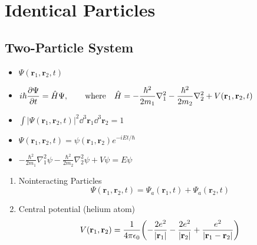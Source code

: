 \chapter{Identical Particles}

\section{Two-Particle System}
\begin{itemize}
	\item \(\Psi(\mathbf{r}_1,\mathbf{r}_2,t)\)
	\item \(\displaystyle{ i\hbar\pdv{\Psi}{t}=\hat{H}\Psi,\qquad\text{where} \quad \hat{H}=-\frac{\hbar^2}{2m_1}\nabla_1^2-\frac{\hbar^2}{2m_2}\nabla_2^2+V(\mathbf{r}_1,\mathbf{r}_2,t) }\)
	\item \(\displaystyle{  \int |\Psi(\mathbf{r}_1,\mathbf{r}_2,t)|^2 
		\dd^3\mathbf{r}_1 \dd^3\mathbf{r}_2= 1 }\)
	\item \(\Psi(\mathbf{r}_1,\mathbf{r}_2,t)=\psi(\mathbf{r}_1,\mathbf{r}_2)e^{-iEt/\hbar}\)
	\item \(\displaystyle{  -\frac{\hbar^2}{2m_1}\nabla_1^2\psi -\frac{\hbar^2}{2m_2}\nabla_2^2\psi+V\psi=E\psi }\)
\end{itemize}
\begin{enumerate}
	\item Nointeracting Particles
	\[\Psi(\mathbf{r}_1,\mathbf{r}_2,t) = \Psi_a(\mathbf{r}_1,t) + \Psi_a(\mathbf{r}_2,t)\]
    \item Central potential (helium atom)
	   \[V(\mathbf{r}_1,\mathbf{r}_2)=\frac{1}{4\pi\epsilon_0}
	     \qty(-\frac{2e^2}{|\mathbf{r}_1|}-\frac{2e^2}{|\mathbf{r}_2|}+\frac{e^2}{|\mathbf{r}_1-\mathbf{r}_2|})\]
\end{enumerate}
